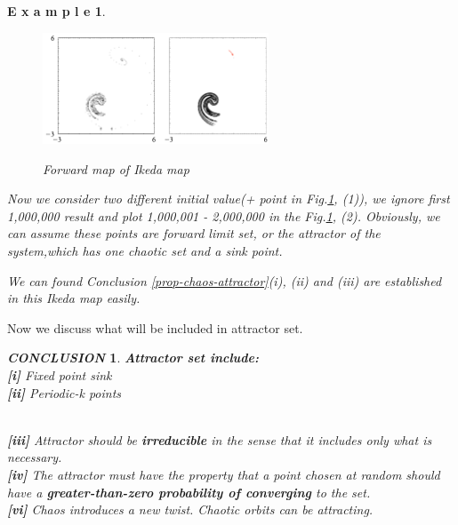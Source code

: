 \documentclass[12pt]{article}
\theoremstyle{plain}
\newtheorem{example}{\textbf{E x a m p l e}}[section]
\newtheorem{conclusion}{\textit{\textbf{CONCLUSION}}}[section]
\begin{document}
\begin{example}
\begin{figure}[H]
\begin{center}
\includegraphics[width=0.6\textwidth]{figure/section7/Ikeda-intro-attrractor.png} \\
\caption{Forward map of Ikeda map}\label{Ikeda-intro}
\end{center}
\end{figure}

Now we consider two different initial value(+ point in Fig.\ref{Ikeda-intro}, (1)), we ignore first 1,000,000 result and plot 1,000,001 - 2,000,000 in the Fig.\ref{Ikeda-intro}, (2). Obviously, we can assume these points are forward limit set, or the attractor of the system,which has one chaotic set and a sink point. 

We can found Conclusion \ref{prop-chaos-attractor}(i), (ii) and (iii) are established in this Ikeda map easily.
\end{example}


Now we discuss what will be included in attractor set.
\begin{conclusion}\textbf{Attractor set include: }
\\\noindent \textbf{[i]} Fixed point sink
\\\noindent \textbf{[ii]} Periodic-k points

\\\noindent \textbf{[iii]} Attractor should be \textbf{irreducible} in the sense that it includes only what is necessary. 
\\\noindent \textbf{[iv]} The attractor must have the property that a point chosen at random should have a \textbf{greater-than-zero probability of converging} to the set.
\\\noindent \textbf{[vi]} Chaos introduces a new twist. Chaotic orbits can be attracting.
\end{conclusion}
\end{document}
